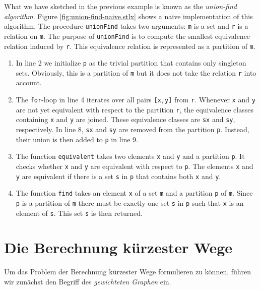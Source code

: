 What we have sketched in the previous example is known as the \emph{union-find algorithm}.
Figure \ref{fig:union-find-naive.stlx} shows a naive implementation of this algorithm.  The
procedure \texttt{unionFind} takes two arguments: \texttt{m} is a set and \texttt{r} is a relation
on \texttt{m}.  The purpose of \texttt{unionFind} is to compute the smallest equivalence relation
induced by \texttt{r}.  This equivalence relation is represented as a partition of \texttt{m}.
\begin{enumerate}
\item In line 2 we initialize \texttt{p} as the trivial partition that contains only singleton
      sets.  Obviously, this is a partition of \texttt{m} but it does not take the
      relation \texttt{r} into account.
\item The \texttt{for}-loop in line 4 iterates over all pairs \texttt{[x,y]} from \texttt{r}.
      Whenever \texttt{x} and \texttt{y} are not yet equivalent with respect to the partition
      \texttt{r}, the equivalence classes containing \texttt{x} and \texttt{y} are joined.
      These equivalence classes are \texttt{sx} and \texttt{sy}, respectively.  In line 8,
      \texttt{sx} and \texttt{sy} are removed from the partition \texttt{p}.  Instead, 
      their union is then added to \texttt{p} in line 9.
\item The function \texttt{equivalent} takes two elements \texttt{x} and \texttt{y} and a partition
      \texttt{p}.  It checks whether \texttt{x} and \texttt{y} are equivalent with respect to
      \texttt{p}.  The elements \texttt{x} and \texttt{y} are equivalent if  there is a set
      \texttt{s} in \texttt{p} that contains both \texttt{x} and \texttt{y}.
\item The function \texttt{find} takes an element \texttt{x} of a set \texttt{m} and a partition
      \texttt{p} of \texttt{m}.  Since \texttt{p} is a partition of \texttt{m} there must be exactly
      one set \texttt{s} in \texttt{p} such that \texttt{x} is an element of \texttt{s}.  This set
      \texttt{s} is then returned.
\end{enumerate}

\section[Shortest Paths]{Die Berechnung k\"urzester Wege}
Um das Problem der Berechnung k\"urzester Wege formulieren zu k\"onnen, f\"uhren wir zun\"achst 
den Begriff des \emph{gewichteten Graphen} ein.  

